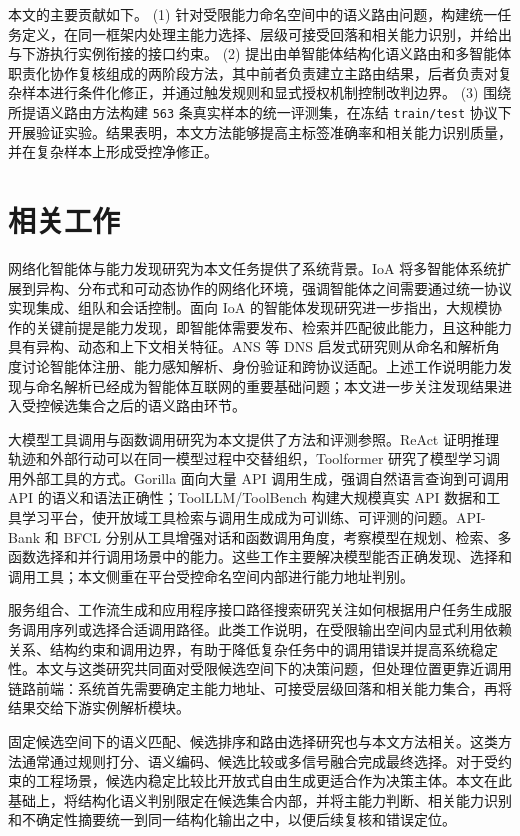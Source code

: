 \documentclass[10pt,a4paper,twocolumn,fontset=fandol]{ctexart}
\begin{document}
本文的主要贡献如下。
(1) 针对受限能力命名空间中的语义路由问题，构建统一任务定义，在同一框架内处理主能力选择、层级可接受回落和相关能力识别，并给出与下游执行实例衔接的接口约束。  
(2) 提出由单智能体结构化语义路由和多智能体职责化协作复核组成的两阶段方法，其中前者负责建立主路由结果，后者负责对复杂样本进行条件化修正，并通过触发规则和显式授权机制控制改判边界。  
(3) 围绕所提语义路由方法构建 \texttt{563} 条真实样本的统一评测集，在冻结 \texttt{train/test} 协议下开展验证实验。结果表明，本文方法能够提高主标签准确率和相关能力识别质量，并在复杂样本上形成受控净修正。

\section{相关工作}

网络化智能体与能力发现研究为本文任务提供了系统背景。IoA 将多智能体系统扩展到异构、分布式和可动态协作的网络化环境，强调智能体之间需要通过统一协议实现集成、组队和会话控制\cite{ioa}。面向 IoA 的智能体发现研究进一步指出，大规模协作的关键前提是能力发现，即智能体需要发布、检索并匹配彼此能力，且这种能力具有异构、动态和上下文相关特征\cite{agentdiscovery}。ANS 等 DNS 启发式研究则从命名和解析角度讨论智能体注册、能力感知解析、身份验证和跨协议适配\cite{ans}。上述工作说明能力发现与命名解析已经成为智能体互联网的重要基础问题；本文进一步关注发现结果进入受控候选集合之后的语义路由环节。

大模型工具调用与函数调用研究为本文提供了方法和评测参照。ReAct 证明推理轨迹和外部行动可以在同一模型过程中交替组织\cite{react}，Toolformer 研究了模型学习调用外部工具的方式\cite{toolformer}。Gorilla 面向大量 API 调用生成，强调自然语言查询到可调用 API 的语义和语法正确性\cite{gorilla}；ToolLLM/ToolBench 构建大规模真实 API 数据和工具学习平台，使开放域工具检索与调用生成成为可训练、可评测的问题\cite{toollm}。API-Bank 和 BFCL 分别从工具增强对话和函数调用角度，考察模型在规划、检索、多函数选择和并行调用场景中的能力\cite{apibank,bfcl}。这些工作主要解决模型能否正确发现、选择和调用工具；本文侧重在平台受控命名空间内部进行能力地址判别。

服务组合、工作流生成和应用程序接口路径搜索研究关注如何根据用户任务生成服务调用序列或选择合适调用路径\cite{liang2026workflow}。此类工作说明，在受限输出空间内显式利用依赖关系、结构约束和调用边界，有助于降低复杂任务中的调用错误并提高系统稳定性。本文与这类研究共同面对受限候选空间下的决策问题，但处理位置更靠近调用链路前端：系统首先需要确定主能力地址、可接受层级回落和相关能力集合，再将结果交给下游实例解析模块。

固定候选空间下的语义匹配、候选排序和路由选择研究也与本文方法相关\cite{dpr,routellm}。这类方法通常通过规则打分、语义编码、候选比较或多信号融合完成最终选择。对于受约束的工程场景，候选内稳定比较比开放式自由生成更适合作为决策主体。本文在此基础上，将结构化语义判别限定在候选集合内部，并将主能力判断、相关能力识别和不确定性摘要统一到同一结构化输出之中，以便后续复核和错误定位。
\end{document}
